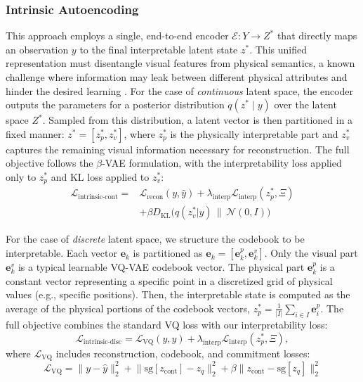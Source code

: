 \documentclass[nonacm,sigconf]{acmart}
\begin{document}
\subsubsection{Intrinsic Autoencoding}

This approach employs a single, end-to-end encoder \(\mathcal{E}: Y \to Z^*\) that directly maps an observation \(y\) to the final interpretable latent state \(z^*\). This unified representation must disentangle visual features from physical semantics, a known challenge where information may leak between different physical attributes and hinder the desired learning \cite[]{peper2025four}.
For the case of \textit{continuous} latent space, the encoder outputs the parameters for a posterior distribution \(q(z^*\mid y)\) over the latent space \(Z^*\). Sampled from this distribution, a latent vector is then partitioned in a fixed manner:  \(z^* = [z_p^*, z_v^*]\), where \(z_p^*\) is the physically interpretable part and \(z_v^*\) captures the remaining visual information necessary for reconstruction. The full objective follows the \(\beta\)-VAE formulation, with the interpretability loss applied only to \(z_p^*\) and KL loss applied to $z_v^*$:
\begin{equation}
\begin{split}
    \mathcal{L}_{\text{intrinsic-cont}} = &\mathcal{L}_{\text{recon}}(y, \hat{y}) + \lambda_{\text{interp}}\mathcal{L}_{\text{interp}}(z_p^*, \Xi) \\
    &+ \beta D_{\text{KL}}\big(q(z_v^*|y) \,\|\, \mathcal{N}(0, I)\big)
\end{split}
\end{equation}


For the case of \textit{discrete} latent space, we structure the codebook to be interpretable. Each vector \(\mathbf{e}_k\) is partitioned as \(\mathbf{e}_k = [\mathbf{e}_k^p, \mathbf{e}_k^v]\).  Only the visual part \(\mathbf{e}_k^v\) is a typical learnable VQ-VAE codebook vector.  The physical part \(\mathbf{e}_k^p\) is a constant vector representing a specific point in a discretized grid of physical values (e.g., specific positions). Then, the interpretable state is computed as the average of the physical portions of the codebook vectors, \( z_p^* = \frac{1}{|I|} \sum_{i \in I} \mathbf{e}_i^p \). The full objective combines the standard VQ loss with our interpretability loss:
\begin{equation}
    \mathcal{L}_{\text{intrinsic-disc}} = \mathcal{L}_{\text{VQ}}(y, \hat{y}) + \lambda_{\text{interp}}\mathcal{L}_{\text{interp}}(z_p^*, \Xi),
\end{equation}
where \(\mathcal{L}_{\text{VQ}}\) includes reconstruction, codebook, and commitment losses:
\begin{equation}
    \mathcal{L}_{\text{VQ}} = \| y - \hat{y} \|_2^2 + \big\| \text{sg}[z_{\text{cont}}] - z_q \big\|_2^2 + \beta \big\| z_{\text{cont}} - \text{sg}[z_q] \big\|_2^2
\end{equation}
\end{document}
